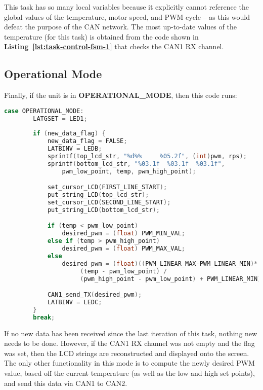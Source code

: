 \documentclass[a4paper, 12pt]{article}
\begin{document}
This task has so many local variables because it explicitly cannot reference the global values of the temperature, motor speed, and PWM cycle -- as this would defeat the purpose of the CAN network. The most up-to-date values of the temperature (for this task) is obtained from the code shown in \textbf{Listing~\ref{lst:task-control-fsm-1}} that checks the CAN1 RX channel.

\subsection{Operational Mode}
\label{subsec:operational-mode}

Finally, if the unit is in \textbf{OPERATIONAL\_MODE}, then this code runs:

	\begin{mdframed}[backgroundcolor=code-gray, roundcorner=10pt,
								innerleftmargin=5, innertopmargin=5, innerbottommargin=5]	
	\begin{lstlisting}[language=C, caption=Control Unit - Operational Mode, tabsize=2, label={lst:task-control-fsm-3}]
	case OPERATIONAL_MODE:
		LATGSET = LED1;
	
		if (new_data_flag) {
			new_data_flag = FALSE;
			LATBINV = LEDB;
			sprintf(top_lcd_str, "%d%%	   %05.2f", (int)pwm, rps);
			sprintf(bottom_lcd_str, "%03.1f  %03.1f  %03.1f",
				pwm_low_point, temp, pwm_high_point);

			set_cursor_LCD(FIRST_LINE_START);
			put_string_LCD(top_lcd_str);
			set_cursor_LCD(SECOND_LINE_START);
			put_string_LCD(bottom_lcd_str);

			if (temp < pwm_low_point)
				desired_pwm = (float) PWM_MIN_VAL;
			else if (temp > pwm_high_point)
				desired_pwm = (float) PWM_MAX_VAL;
			else
				desired_pwm = (float)((PWM_LINEAR_MAX-PWM_LINEAR_MIN)*
					 (temp - pwm_low_point) /
					 (pwm_high_point - pwm_low_point) + PWM_LINEAR_MIN);

			CAN1_send_TX(desired_pwm);
			LATBINV = LEDC;
		}
		break;
	\end{lstlisting}
	\end{mdframed}
	
If no new data has been received since the last iteration of this task, nothing new needs to be done. However, if the CAN1 RX channel was not empty and the flag was set, then the LCD strings are reconstructed and displayed onto the screen. The only other functionality in this mode is to compute the newly desired PWM value, based off the current temperature (as well as the low and high set points), and send this data via CAN1 to CAN2.
\end{document}
